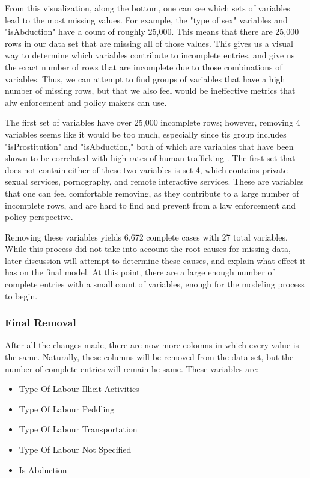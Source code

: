 \documentclass{article} %
\begin{document}
From this visualization, along the bottom, one can see which sets of variables lead to the most missing values. For example, the "type of sex" variables and "isAbduction" have a count of roughly 25,000. This means that there are 25,000 rows in our data set that are missing all of those values. This gives us a visual way to determine which variables contribute to incomplete entries, and give us the exact number of rows that are incomplete due to those combinations of variables. Thus, we can attempt to find groups of variables that have a high number of missing rows, but that we also feel would be ineffective metrics that alw enforcement and policy makers can use. 

The first set of variables have over 25,000 incomplete rows; however, removing 4 variables seems like it would be too much, especially since tis group includes "isProstitution" and "isAbduction," both of which are variables that have been shown to be correlated with high rates of human trafficking \parencite{SlaveBook, polarisTypology}. The first set that does not contain either of these two variables is set 4, which contains private sexual services, pornography, and remote interactive services. These are variables that one can feel comfortable removing, as they contribute to a large number of incomplete rows, and are hard to find and prevent from a law enforcement and policy perspective.

Removing these variables yields 6,672 complete cases with 27 total variables. While this process did not take into account the root causes for missing data, later discussion will attempt to determine these causes, and explain what effect it has on the final model. At this point, there are a large enough number of complete entries with a small count of variables, enough for the modeling process to begin.

\subsubsection{Final Removal}

After all the changes made, there are now more colomns in which every value is the same. Naturally, these columns will be removed from the data set, but the number of complete entries will remain he same. These variables are:

\begin{itemize}
	\item Type Of Labour Illicit Activities
	\item Type Of Labour Peddling	
	\item Type Of Labour Transportation
	\item Type Of Labour Not Specified
	\item Is Abduction		
\end{itemize}
\end{document}
